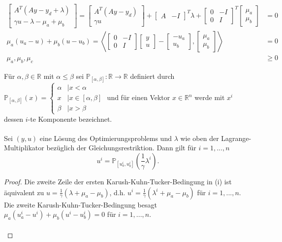\begin{compactenum}[(i)]
\begin{align*}
\begin{bmatrix}A^T(Ay-y_d+\lambda)\\\gamma u-\lambda-\mu_a+\mu_b\end{bmatrix}=\begin{bmatrix}A^T(Ay-y_d)\\\gamma u\end{bmatrix}+\begin{bmatrix}A&-I\end{bmatrix}^T\lambda+\begin{bmatrix}0&-I\\0&I\end{bmatrix}^T\begin{bmatrix}\mu_a\\\mu_b\end{bmatrix}&=0\\\mu_a(u_a-u)+\mu_b(u-u_b)=\left\langle\begin{bmatrix}0&-I\\0&I\end{bmatrix}\begin{bmatrix}y\\u\end{bmatrix}-\begin{bmatrix}-u_a\\u_b\end{bmatrix} ,\begin{bmatrix}\mu_a\\\mu_b\end{bmatrix} \right\rangle &=0\\\mu_a,\mu_b,\mu_c&\geq 0\end{align*}\newpage
\item Für $\alpha,\beta\in\mathbb R$ mit $\alpha\leq\beta$ sei $\mathbb P_{[\alpha,\beta]}:\mathbb R\to\mathbb R$ definiert durch $\mathbb P_{[\alpha,\beta]}(x)=\begin{cases}\alpha&\mid x<\alpha\\x&\mid x\in[\alpha,\beta]\\\beta&\mid x>\beta\end{cases}$
und für einen Vektor $x\in\mathbb R^n$ werde mit $x^i$ dessen $i$-te Komponente bezeichnet. \\\\
Sei $(y,u)$ eine Lösung des Optimierungsproblems und $\lambda$ wie oben der Lagrange-Multiplikator bezüglich der Gleichungsrestriktion. Dann gilt für $i=1,...,n$
$$u^i = \mathbb P_{[u_a^i,u_b^i]}\left(\frac{1}{\gamma}\lambda^i\right).$$
\begin{proof}
Die zweite Zeile der ersten Karush-Kuhn-Tucker-Bedingung in (i) ist äquivalent zu $u=\frac{1}{\gamma}(\lambda+\mu_a-\mu_b)$, d.h. $ u^i=\frac{1}{\gamma}(\lambda^i+\mu_a-\mu_b)$ für $i=1,...,n$. Die zweite Karush-Kuhn-Tucker-Bedingung besagt $\mu_a(u_a^i-u^i)+\mu_b(u^i-u_b^i)=0$ für $i=1,...,n$.\\\\

\end{proof}
\end{compactenum}
